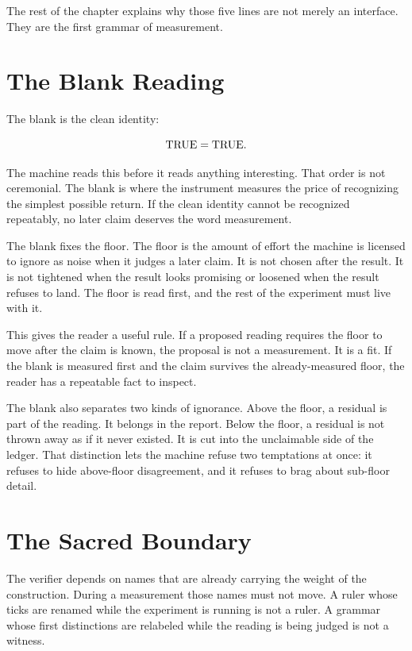 The rest of the chapter explains why those five lines are not merely an
interface. They are the first grammar of measurement.

\section{The Blank Reading}

The blank is the clean identity:

\[
\hbox{TRUE}=\hbox{TRUE}.
\]

The machine reads this before it reads anything interesting. That order is not
ceremonial. The blank is where the instrument measures the price of recognizing
the simplest possible return. If the clean identity cannot be recognized
repeatably, no later claim deserves the word measurement.

The blank fixes the floor. The floor is the amount of effort the machine is
licensed to ignore as noise when it judges a later claim. It is not chosen
after the result. It is not tightened when the result looks promising or
loosened when the result refuses to land. The floor is read first, and the rest
of the experiment must live with it.

This gives the reader a useful rule. If a proposed reading requires the floor
to move after the claim is known, the proposal is not a measurement. It is a
fit. If the blank is measured first and the claim survives the already-measured
floor, the reader has a repeatable fact to inspect.

The blank also separates two kinds of ignorance. Above the floor, a residual is
part of the reading. It belongs in the report. Below the floor, a residual is
not thrown away as if it never existed. It is cut into the unclaimable side of
the ledger. That distinction lets the machine refuse two temptations at once:
it refuses to hide above-floor disagreement, and it refuses to brag about
sub-floor detail.

\section{The Sacred Boundary}

The verifier depends on names that are already carrying the weight of the
construction. During a measurement those names must not move. A ruler whose
ticks are renamed while the experiment is running is not a ruler. A grammar
whose first distinctions are relabeled while the reading is being judged is not
a witness.

